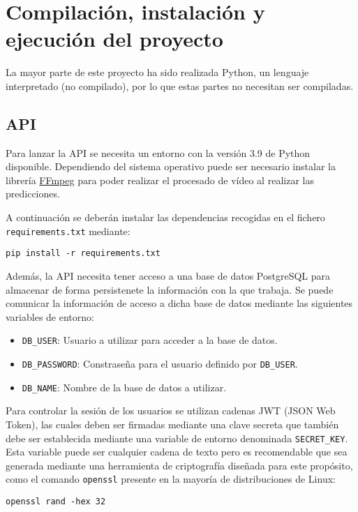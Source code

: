 \section{Compilación, instalación y ejecución del proyecto}

La mayor parte de este proyecto ha sido realizada Python, un lenguaje
interpretado (no compilado), por lo que estas partes no necesitan ser
compiladas.

\subsection{API}

Para lanzar la API se necesita un entorno con la versión 3.9 de Python
disponible. Dependiendo del sistema operativo puede ser necesario instalar la
librería \href{https://ffmpeg.org}{FFmpeg} para poder realizar el procesado de
vídeo al realizar las predicciones.

A continuación se deberán instalar las dependencias recogidas en el fichero
\texttt{requirements.txt} mediante:

\texttt{pip install -r requirements.txt}

Además, la API necesita tener acceso a una base de datos PostgreSQL para
almacenar de forma persistenete la información con la que trabaja. Se puede
comunicar la información de acceso a dicha base de datos mediante las siguientes
variables de entorno:

\begin{itemize}
    \item \texttt{DB\_USER}: Usuario a utilizar para acceder a la base de datos.
    \item \texttt{DB\_PASSWORD}: Constraseña para el usuario definido por
    \texttt{DB\_USER}.
    \item \texttt{DB\_NAME}: Nombre de la base de datos a utilizar.
\end{itemize}

Para controlar la sesión de los usuarios se utilizan cadenas JWT (JSON Web
Token), las cuales deben ser firmadas mediante una clave secreta que también
debe ser establecida mediante una variable de entorno denominada
\texttt{SECRET\_KEY}. Esta variable puede ser cualquier cadena de texto pero es
recomendable que sea generada mediante una herramienta de criptografía diseñada
para este propósito, como el comando \texttt{openssl} presente en la mayoría de
distribuciones de Linux:

\texttt{openssl rand -hex 32}

